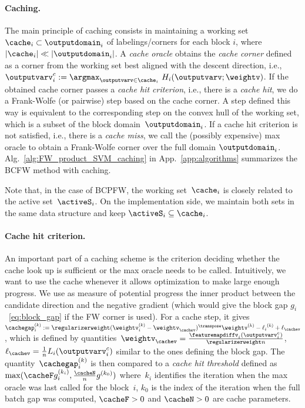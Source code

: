 \documentclass{article}
\begin{document}
\paragraph{Caching.}
The main principle of caching consists in maintaining a working set $\cache_i \subset \outputdomain_i$ of labelings/corners for each block $i$, where $|\cache_i|\ll|\outputdomain_i|$.
A \emph{cache oracle} obtains the \emph{cache corner} defined as a corner from the working set best aligned with the descent direction, i.e., $\outputvarv_i^c := \argmax_{\outputvarv\in\cache_i} \ H_i(\outputvarv;\weightv)$. 
If the obtained cache corner passes a \emph{cache hit criterion}, i.e., there is a \emph{cache hit}, we do a Frank-Wolfe (or pairwise) step based on the cache corner.
A step defined this way is equivalent to the corresponding step on the convex hull of the working set, which is a subset of the block domain~$\outputdomain_i$.
If a cache hit criterion is not satisfied, i.e., there is a \emph{cache miss}, we call the (possibly expensive) max oracle to obtain a Frank-Wolfe corner over the full domain $\outputdomain_i$.
Alg.~\ref{alg:FW_product_SVM_caching} in App.~\ref{app:algorithms} summarizes the BCFW method with caching.

Note that, in the case of BCPFW, the working set~$\cache_i$ is closely related to the active set~$\activeS_i$. 
On the implementation side, we maintain both sets in the same data structure and keep $\activeS_i \subseteq \cache_i$.

%
%
%
%
%
%
%
%
%
%
%
%
%
%
%
%

\paragraph{Cache hit criterion.}
An important part of a caching scheme is the criterion deciding whether the cache look up is sufficient or the max oracle needs to be called.
Intuitively, we want to use the cache whenever it allows optimization to make large enough progress.
We use as measure of potential progress the inner product between the candidate direction and the negative gradient (which would give the block gap $g_i$~\eqref{eq:block_gap} if the FW corner is used). For a cache step, it gives $\cachegap_i^{(k)} := \regularizerweight(\weightv_i^{(k)}-\weightv_{\cachev})^\transpose \weightv^{(k)}-{\ell_i}^{(k)}+\ell_{\cachev}$, which is defined by quantities~$\weightv_{\cachev} = \frac{ \featuremapdiffv_i(\outputvarv_i^c)}{\regularizerweight n}$, $\ell_{\cachev}=\frac1n L_i(\outputvarv_i^c)$ similar to the ones defining the block gap.
The quantity~$\cachegap_i^{(k)}$ is then compared to a \emph{cache hit threshold} defined as~$\max(\cacheF g_i^{(k_i)},\frac{\cacheN}{n} g^{(k_0)})$ where~$k_i$ identifies the iteration when the max oracle was last called for the block~$i$, $k_0$ is the index of the iteration when the full batch gap was computed, $\cacheF>0$ and $\cacheN>0$ are cache parameters. 
\end{document}
